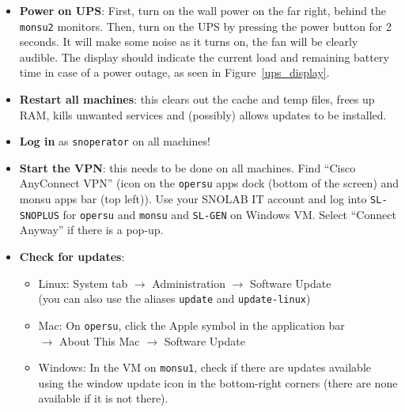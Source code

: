\documentclass[12pt, a4paper]{article}
\begin{document}
\begin{itemize}
	\item \textbf{Power on UPS}: First, turn on the wall power on the far right, behind the {\tt monsu2} monitors. Then, turn on the UPS by pressing the power button for 2 seconds. It will make some noise as it turns on, the fan will be clearly audible. The display should indicate the current load and remaining battery time in case of a power outage, as seen in Figure~\ref{ups_display}.
	\item \textbf{Restart all machines}: this clears out the cache and temp files, frees up RAM, kills unwanted services and (possibly) allows updates to be installed.
	\item \textbf{Log in} as {\tt snoperator} on all machines!
	\item \textbf{Start the VPN}: this needs to be done on all machines. Find ``Cisco AnyConnect VPN'' (icon on the {\tt opersu} apps dock (bottom of the screen) and monsu apps bar (top left)). Use your SNOLAB IT account and log into {\tt SL-SNOPLUS} for {\tt opersu} and {\tt monsu} and {\tt SL-GEN} on Windows VM. Select ``Connect Anyway'' if there is a pop-up.
	\item \textbf{Check for updates}:
	\begin{itemize}
		\item Linux: System tab $\rightarrow$ Administration $\rightarrow$ Software Update \\
		      (you can also use the aliases {\tt update} and {\tt update-linux})
		\item Mac: On {\tt opersu}, click the Apple symbol in the application bar \\
		      $\rightarrow$ About This Mac $\rightarrow$ Software Update 
		\item Windows: In the VM on {\tt monsu1}, check if there are updates available using the window update icon in the bottom-right corners (there are none available if it is not there).
	\end{itemize}
\end{itemize}

\end{document}
